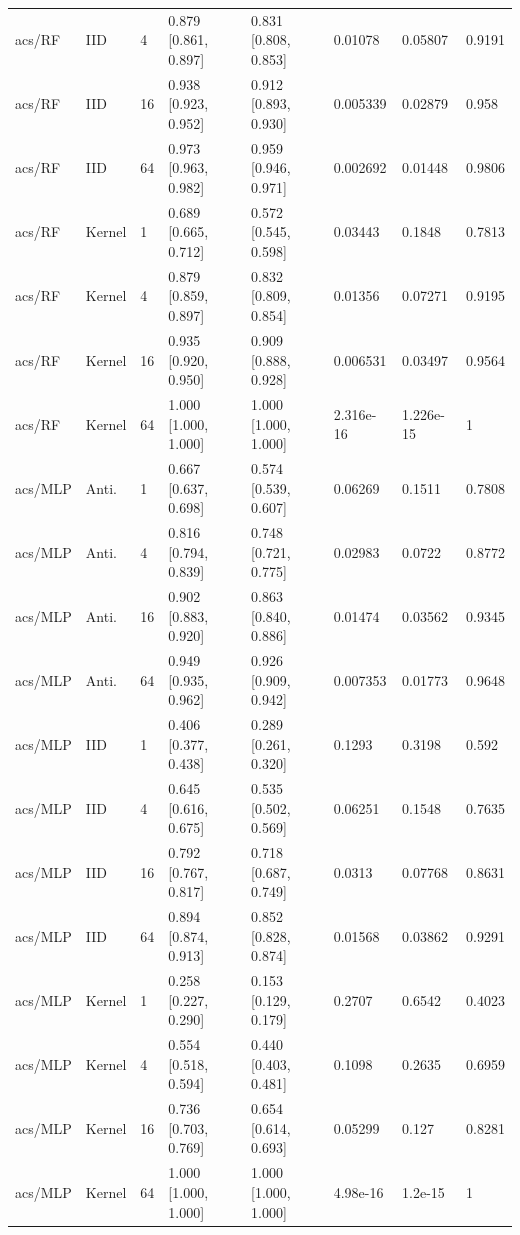 \begin{tabular}{llllllll}
acs/RF & IID & 4 & 0.879 [0.861, 0.897] & 0.831 [0.808, 0.853] & 0.01078 & 0.05807 & 0.9191 \\
acs/RF & IID & 16 & 0.938 [0.923, 0.952] & 0.912 [0.893, 0.930] & 0.005339 & 0.02879 & 0.958 \\
acs/RF & IID & 64 & 0.973 [0.963, 0.982] & 0.959 [0.946, 0.971] & 0.002692 & 0.01448 & 0.9806 \\
acs/RF & Kernel & 1 & 0.689 [0.665, 0.712] & 0.572 [0.545, 0.598] & 0.03443 & 0.1848 & 0.7813 \\
acs/RF & Kernel & 4 & 0.879 [0.859, 0.897] & 0.832 [0.809, 0.854] & 0.01356 & 0.07271 & 0.9195 \\
acs/RF & Kernel & 16 & 0.935 [0.920, 0.950] & 0.909 [0.888, 0.928] & 0.006531 & 0.03497 & 0.9564 \\
acs/RF & Kernel & 64 & 1.000 [1.000, 1.000] & 1.000 [1.000, 1.000] & 2.316e-16 & 1.226e-15 & 1 \\
acs/MLP & Anti. & 1 & 0.667 [0.637, 0.698] & 0.574 [0.539, 0.607] & 0.06269 & 0.1511 & 0.7808 \\
acs/MLP & Anti. & 4 & 0.816 [0.794, 0.839] & 0.748 [0.721, 0.775] & 0.02983 & 0.0722 & 0.8772 \\
acs/MLP & Anti. & 16 & 0.902 [0.883, 0.920] & 0.863 [0.840, 0.886] & 0.01474 & 0.03562 & 0.9345 \\
acs/MLP & Anti. & 64 & 0.949 [0.935, 0.962] & 0.926 [0.909, 0.942] & 0.007353 & 0.01773 & 0.9648 \\
acs/MLP & IID & 1 & 0.406 [0.377, 0.438] & 0.289 [0.261, 0.320] & 0.1293 & 0.3198 & 0.592 \\
acs/MLP & IID & 4 & 0.645 [0.616, 0.675] & 0.535 [0.502, 0.569] & 0.06251 & 0.1548 & 0.7635 \\
acs/MLP & IID & 16 & 0.792 [0.767, 0.817] & 0.718 [0.687, 0.749] & 0.0313 & 0.07768 & 0.8631 \\
acs/MLP & IID & 64 & 0.894 [0.874, 0.913] & 0.852 [0.828, 0.874] & 0.01568 & 0.03862 & 0.9291 \\
acs/MLP & Kernel & 1 & 0.258 [0.227, 0.290] & 0.153 [0.129, 0.179] & 0.2707 & 0.6542 & 0.4023 \\
acs/MLP & Kernel & 4 & 0.554 [0.518, 0.594] & 0.440 [0.403, 0.481] & 0.1098 & 0.2635 & 0.6959 \\
acs/MLP & Kernel & 16 & 0.736 [0.703, 0.769] & 0.654 [0.614, 0.693] & 0.05299 & 0.127 & 0.8281 \\
acs/MLP & Kernel & 64 & 1.000 [1.000, 1.000] & 1.000 [1.000, 1.000] & 4.98e-16 & 1.2e-15 & 1 \\
\bottomrule
\end{tabular}


